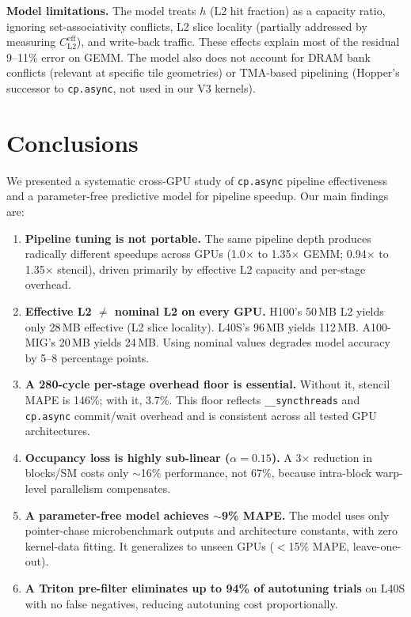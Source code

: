 \documentclass[sigplan,nonacm,10pt]{acmart}
\newcommand{\cpasync}{\texttt{cp.async}}
\begin{document}
\textbf{Model limitations.}
The model treats $h$ (L2 hit fraction) as a capacity ratio, ignoring
set-associativity conflicts, L2 slice locality (partially addressed by
measuring $C_{\text{L2}}^{\text{eff}}$), and write-back traffic.
These effects explain most of the residual 9--11\% error on GEMM.
The model also does not account for DRAM bank conflicts (relevant at
specific tile geometries) or TMA-based pipelining (Hopper's successor
to \cpasync{}, not used in our V3 kernels).

\section{Conclusions}
\label{sec:conclusions}

We presented a systematic cross-GPU study of \cpasync{} pipeline
effectiveness and a parameter-free predictive model for pipeline speedup.
Our main findings are:

\begin{enumerate}
\item \textbf{Pipeline tuning is not portable.}
  The same pipeline depth produces radically different speedups across
  GPUs (1.0$\times$ to 1.35$\times$ GEMM; 0.94$\times$ to 1.35$\times$
  stencil), driven primarily by effective L2 capacity and per-stage
  overhead.

\item \textbf{Effective L2 $\neq$ nominal L2 on every GPU.}
  H100's 50\,MB L2 yields only 28\,MB effective (L2 slice locality).
  L40S's 96\,MB yields 112\,MB.
  A100-MIG's 20\,MB yields 24\,MB.
  Using nominal values degrades model accuracy by 5--8 percentage points.

\item \textbf{A 280-cycle per-stage overhead floor is essential.}
  Without it, stencil MAPE is 146\%; with it, 3.7\%.
  This floor reflects \texttt{\_\_syncthreads} and \cpasync{} commit/wait
  overhead and is consistent across all tested GPU architectures.

\item \textbf{Occupancy loss is highly sub-linear ($\alpha = 0.15$).}
  A 3$\times$ reduction in blocks/SM costs only $\sim$16\% performance,
  not 67\%, because intra-block warp-level parallelism compensates.

\item \textbf{A parameter-free model achieves $\sim$9\% MAPE.}
  The model uses only pointer-chase microbenchmark outputs and
  architecture constants, with zero kernel-data fitting.
  It generalizes to unseen GPUs ($<$15\% MAPE, leave-one-out).

\item \textbf{A Triton pre-filter eliminates up to 94\% of autotuning
  trials} on L40S with no false negatives, reducing autotuning cost
  proportionally.
\end{enumerate}



\end{document}

